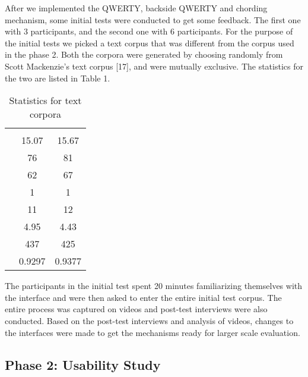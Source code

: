 After we implemented the QWERTY, backside QWERTY and chording mechanism, some initial tests were conducted to get some feedback. The first one with 3 participants, and the second one with 6 participants. For the purpose of the initial tests we picked a text corpus that was different from the corpus used in the phase 2. Both the corpora were generated by choosing randomly from Scott Mackenzie's text corpus [17], and were mutually exclusive. The statistics for the two are listed in Table 1.

\begin{table}
	\centering
		\begin{tabular}{rcc}
		                         & \begin{minipage}{2cm} \centering \color{grey}{Study corpus}\end{minipage} & \begin{minipage}{2cm} \centering \color{grey}{Initial test corpus}\end{minipage}  \\ 
			 \color{grey}{Average phrase length} & 15.07 & 15.67 \\ 
			 \color{grey}{Number of words} & 76 & 81 \\ 
			 \color{grey}{Unique words} & 62 & 67 \\ 
			 \color{grey}{Min. length of word} & 1 & 1 \\ 
			 \color{grey}{Max. length of word} & 11 & 12 \\ 
			 \color{grey}{Average word length} & 4.95 & 4.43 \\ 
			 \color{grey}{Number of characters} & 437 & 425 \\ 
			 \color{grey}{Correlation with English} & 0.9297 & 0.9377 \\ 
		\end{tabular}
	\caption{Statistics for text corpora}
	\label{tab:StatisticsForTextCorpora}
\end{table}

The participants in the initial test spent 20 minutes familiarizing themselves with the interface and were then asked to enter the entire initial test corpus. The entire process was captured on videos and post-test interviews were also conducted. Based on the post-test interviews and analysis of videos, changes to the interfaces were
made to get the mechanisms ready for larger scale evaluation.

\subsection{Phase 2: Usability Study}
